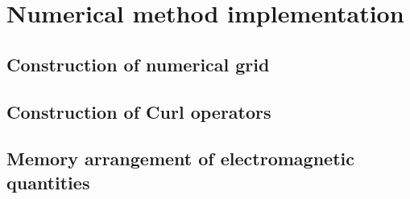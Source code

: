 


\section{Numerical method implementation}

\subsection{Construction of numerical grid}

\subsection{Construction of Curl operators}

\subsection{Memory arrangement of electromagnetic quantities}

